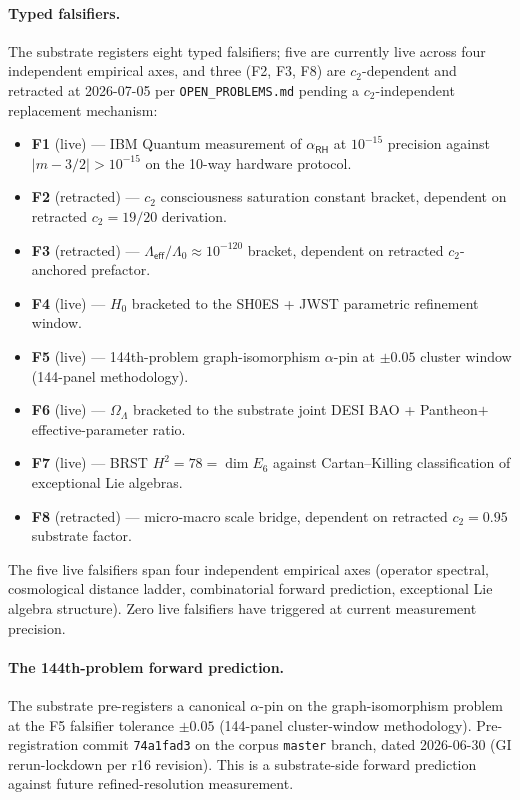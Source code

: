 \documentclass[11pt,a4paper]{amsart}
\theoremstyle{plain}
\theoremstyle{definition}
\begin{document}
\paragraph{Typed falsifiers.} The substrate registers eight typed falsifiers; five are currently live across four independent empirical axes, and three (F2, F3, F8) are $c_2$-dependent and retracted at 2026-07-05 per \texttt{OPEN\_PROBLEMS.md} pending a $c_2$-independent replacement mechanism:
\begin{itemize}[itemsep=1pt,leftmargin=2em]
\item \textbf{F1} (live) — IBM Quantum measurement of $\alpha_{\textsf{RH}}$ at $10^{-15}$ precision against $|m - 3/2| > 10^{-15}$ on the 10-way hardware protocol.
\item \textbf{F2} (retracted) — $c_2$ consciousness saturation constant bracket, dependent on retracted $c_2 = 19/20$ derivation.
\item \textbf{F3} (retracted) — $\Lambda_{\textsf{eff}}/\Lambda_0 \approx 10^{-120}$ bracket, dependent on retracted $c_2$-anchored prefactor.
\item \textbf{F4} (live) — $H_0$ bracketed to the SH0ES + JWST parametric refinement window.
\item \textbf{F5} (live) — 144th-problem graph-isomorphism $\alpha$-pin at $\pm 0.05$ cluster window (144-panel methodology).
\item \textbf{F6} (live) — $\Omega_\Lambda$ bracketed to the substrate joint DESI BAO + Pantheon$+$ effective-parameter ratio.
\item \textbf{F7} (live) — BRST $H^2 = 78 = \dim E_6$ against Cartan--Killing classification of exceptional Lie algebras.
\item \textbf{F8} (retracted) — micro-macro scale bridge, dependent on retracted $c_2 = 0.95$ substrate factor.
\end{itemize}
The five live falsifiers span four independent empirical axes (operator spectral, cosmological distance ladder, combinatorial forward prediction, exceptional Lie algebra structure). Zero live falsifiers have triggered at current measurement precision.

\paragraph{The 144th-problem forward prediction.} The substrate pre-registers a canonical $\alpha$-pin on the graph-isomorphism problem at the F5 falsifier tolerance $\pm 0.05$ (144-panel cluster-window methodology). Pre-registration commit \texttt{74a1fad3} on the corpus \texttt{master} branch, dated 2026-06-30 (GI rerun-lockdown per r16 revision). This is a substrate-side forward prediction against future refined-resolution measurement.
\end{document}
